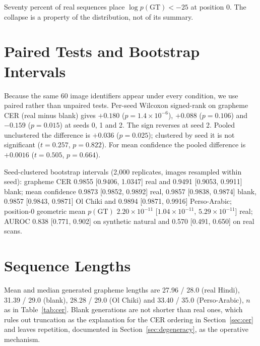\documentclass{article}
\begin{document}
Seventy percent of real sequences place $\log p(\mathrm{GT}) < -25$ at position 0. The
collapse is a property of the distribution, not of its summary.

\section{Paired Tests and Bootstrap Intervals}
\label{app:stats}

Because the same 60 image identifiers appear under every condition, we use paired rather than
unpaired tests. Per-seed Wilcoxon signed-rank on grapheme CER (real minus blank) gives
$+0.180$ ($p = 1.4\times10^{-6}$), $+0.088$ ($p = 0.106$) and $-0.159$ ($p = 0.015$) at seeds
0, 1 and 2. The sign reverses at seed 2. Pooled unclustered the difference is $+0.036$
($p = 0.025$); clustered by seed it is not significant ($t = 0.257$, $p = 0.822$). For mean
confidence the pooled difference is $+0.0016$ ($t = 0.505$, $p = 0.664$).

Seed-clustered bootstrap intervals (2{,}000 replicates, images resampled within seed):
grapheme CER 0.9855 [0.9406, 1.0347] real and 0.9491 [0.9053, 0.9911] blank; mean confidence
0.9873 [0.9852, 0.9892] real, 0.9857 [0.9838, 0.9874] blank, 0.9857 [0.9843, 0.9871] Ol Chiki
and 0.9894 [0.9871, 0.9916] Perso-Arabic; position-0 geometric mean $p(\mathrm{GT})$
$2.20\times10^{-11}$ [$1.04\times10^{-11}$, $5.29\times10^{-11}$] real; AUROC 0.838
[0.771, 0.902] on synthetic natural and 0.570 [0.491, 0.650] on real scans.

\section{Sequence Lengths}
\label{app:lengths}

Mean and median generated grapheme lengths are 27.96 / 28.0 (real Hindi), 31.39 / 29.0
(blank), 28.28 / 29.0 (Ol Chiki) and 33.40 / 35.0 (Perso-Arabic), $n$ as in
Table~\ref{tab:cer}. Blank generations are not shorter than real ones, which rules out
truncation as the explanation for the CER ordering in Section~\ref{sec:cer} and leaves
repetition, documented in Section~\ref{sec:degeneracy}, as the operative mechanism.
\end{document}
